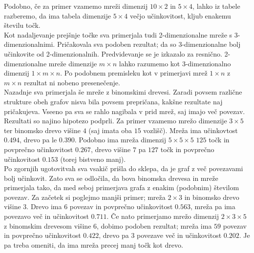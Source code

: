 \documentclass[a4paper, 16pt]{article}
\begin{document}
    Podobno, če za primer vzamemo mreži dimenzij $10 \times 2$ in $5 \times 4$, lahko iz tabele razberemo, da ima tabela dimenzije
    $5 \times 4$ večjo učinkovitost, kljub enakemu številu točk. \\

    Kot nadaljevanje prejšnje točke sva primerjala tudi 2-dimenzionalne mreže s 3-dimenzionalnimi. Pričakovala sva
    podoben rezultat; da so 3-dimenzionalne bolj učinkovite od 2-dimenzionalnih. Predvidevanje se je izkazalo za resnično.
    2-dimenzionalne mreže dimenzije $m \times n$ lahko razumemo kot 3-dimenzionalno dimenzij $1 \times m \times n$. Po podobnem 
    premisleku kot v primerjavi mrež $1 \times n$ z $m \times n$ rezultat ni nobeno presenečenje.\\

    Nazadnje sva primerjala še mreže z binomskimi drevesi. Zaradi povsem različne strukture obeh grafov nisva bila povsem prepričana,
    kakšne rezultate naj pričakujeva. Vseeno pa sva se rahlo nagibala v prid mrež, saj imajo več povezav. Rezultati so najino hipotezo
    podprli. Za primer vzamemo mrežo dimenzije $3 \times 5$ ter binomsko drevo višine $4$ (saj imata oba $15$ vozlišč). Mreža ima 
    učinkovtost $0.494$, drevo pa le $0.390$. Podobno ima mreža dimenzij $5 \times 5 \times 5$ $125$ točk in povprečno učinkovitost $0.267$,
    drevo višine $7$ pa $127$ točk in povprečno učinkovitost $0.153$ (torej bistveno manj).\\

    Po zgornjih ugotovitvah sva vsakič prišla do sklepa, da je graf z več povezavami bolj učinkovit. Zato sva se odločila, da bova binomska drevesa
    in mreže primerjala tako, da med seboj primerjava grafa z enakim (podobnim) številom povezav. Za začetek si poglejmo manjši primer; mreža 
    $2 \times 3$ in binomsko drevo višine $3$. Drevo ima $6$ povezav in povprečno učinkovitost $0.563$, mreža pa ima povezavo več in učinkovitost $0.711$.
    Če nato primerjamo mrežo dimenzij $2 \times 3 \times 5$ z binomskim drevesom višine $6$, dobimo podoben rezultat; mreža ima $59$ povezav in 
    povprečno učinkovitost $0.422$, drevo pa $3$ povezave več in učinkovitost $0.202$. Je pa treba omeniti, da ima mreža precej manj točk kot drevo.
    
\end{document}
